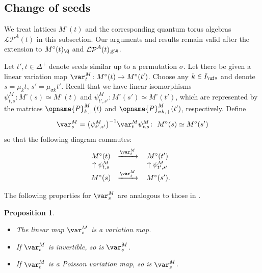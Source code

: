 \documentclass[pdftex]{sigma}
\newcommand{\Mc}{M^\circ}
\newcommand{\Iufv}{I_{\ufv}}
\newcommand{\LP}{{\mathcal{LP}}}
\newcommand{\fFac}{\mathcal{Z}}
\newcommand{\fFacRoot}{\fFac^{\Q}}
\newcommand{\trans}{\opname{P}}
\numberwithin{equation}{section}
\newtheorem{Proposition}[Theorem]{Proposition}
 { \theoremstyle{definition}
\newtheorem{Definition}[Theorem]{Definition}
\newtheorem{Note}[Theorem]{Note}
\newtheorem{Example}[Theorem]{Example}
\newtheorem{Remark}[Theorem]{Remark}
\newtheorem{Assumption}[Theorem]{Assumption}
}
\begin{document}
\subsection{Change of seeds}

We treat lattices $\Mc(t)$ and the corresponding quantum torus algebras
$\LP^A(t)$ in this subsection. Our arguments and results remain valid
after the extension to $\Mc(t)_{\Q}$ and $\LP^A(t)_{\fFacRoot}$.

Let $t',t\in\Delta^{+}$ denote seeds similar up to a permutation
$\sigma$. Let there be given a linear variation map $\var_{t}^{M}\colon\Mc(t)\rightarrow\Mc(t')$.
Choose any $k\in\Iufv$ and denote $s=\mu_{k}t$, ${s'=\mu_{\sigma k}t'}$.
Recall that we have linear isomorphisms $\psi_{t,s}^{M}\colon\Mc(s)\simeq\Mc(t)$
and $\psi_{t',s'}^{M}\colon\Mc(s')\simeq\Mc(t')$, which are represented
by the matrices $\trans_{k,+}^{M}(t)$ and $\trans_{\sigma k,+}^{M}(t')$,
respectively. Define \[\var_{s}^{M}=\big(\psi_{t',s'}^{M}\big)^{-1}\var_{t}^{M}\psi_{t,s}^{M}\colon\ \Mc(s)\simeq\Mc(s')\]
so that the following diagram commutes:
\begin{align}
\begin{array}{@{}ccc}
\Mc(t) & \xrightarrow{\var_{t}^{M}} & \Mc(t')\\
\uparrow\psi_{t,s}^{M} & & \uparrow\psi_{t',s'}^{M}\\
\Mc(s) & \xrightarrow{\var_{s}^{M}} & \,\Mc(s').
\end{array}\label{eq:commute_M_variation}
\end{align}

The following properties for $\var_{s}^{M}$ are analogous to those
in \cite[Proposition 5.1.6]{qin2020dual}.

\begin{Proposition}\label{prop:change_seed_M_variation}\quad
\begin{itemize}\itemsep=0pt
\item[$(1)$] The linear map $\var_{s}^{M}$ is a variation map.
\item[$(2)$] If $\var_{t}^{M}$ is invertible, so is $\var_{s}^{M}$.
\item[$(3)$] If $\var_{t}^{M}$ is a Poisson variation map, so is $\var_{s}^{M}$.
\end{itemize}
\end{Proposition}
\end{document}
